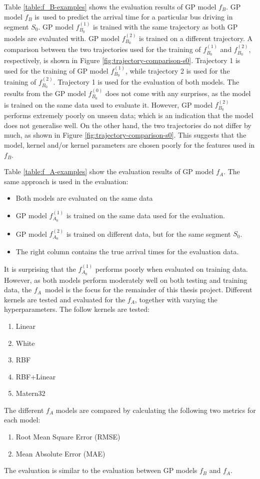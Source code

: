 Table \ref{table:f_B-examples} shows the evaluation results of GP model $f_B$.
GP model $f_B$ is used to predict the arrival time for a particular bus driving in segment $S_0$.
GP model $f^{(1)}_{B_0}$ is trained with the same trajectory as both GP models are evaluated with.
GP model $f^{(2)}_{B_0}$ is trained on a different trajectory.
A comparison between the two trajectories used for the training of $f^{(1)}_{B_0}$ and $f^{(2)}_{B_0}$, respectively, is shown in Figure \ref{fig:trajectory-comparison-s0}.
Trajectory 1 is used for the training of GP model $f^{(1)}_{B_0}$, while trajectory 2 is used for the training of $f^{(2)}_{B_0}$.
Trajectory 1 is used for the evaluation of both models.
The results from the GP model $f^{(0)}_{B_0}$ does not come with any surprises, as the model is trained on the same data used to evaluate it.
However, GP model $f^{(2)}_{B_0}$ performs extremely poorly on unseen data; which is an indication that the model does not generalise well.
On the other hand, the two trajectories do not differ by much, as shown in Figure \ref{fig:trajectory-comparison-s0}.
This suggests that the model, kernel and/or kernel parameters are chosen poorly for the features used in $f_B$.

Table \ref{table:f_A-examples} show the evaluation results of GP model $f_A$.
The same approach is used in the evaluation:
\begin{itemize}
    \item Both models are evaluated on the same data
    \item GP model $f^{(1)}_{A_0}$ is trained on the same data used for the evaluation.
    \item GP model $f^{(2)}_{A_0}$ is trained on different data, but for the same segment $S_0$.
    \item The right column contains the true arrival times for the evaluation data.
\end{itemize}

It is surprising that the $f^{(1)}_{A_0}$ performs poorly when evaluated on training data.
However, as both models perform moderately well on both testing and training data, the $f_A$ model is the focus for the remainder of this thesis project.
Different kernels are tested and evaluated for the $f_A$, together with varying the hyperparameters.
The follow kernels are tested:

\newpage
\begin{enumerate}
    \item Linear
    \item White
    \item RBF
    \item RBF+Linear
    \item Matern32
\end{enumerate}
The different $f_A$ models are compared by calculating the following two metrics for each model:
\begin{enumerate}
    \item Root Mean Square Error (RMSE)
    \item Mean Absolute Error (MAE)
\end{enumerate}
The evaluation is similar to the evaluation between GP models $f_B$ and $f_A$.

